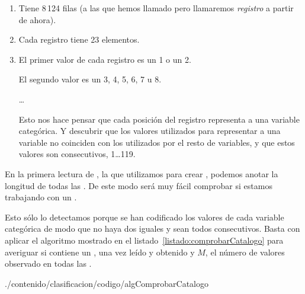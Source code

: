 \begin{enumerate}
	\item Tiene 8\,124 filas (a las que hemos llamado \transacciones pero llamaremos \emph{registro} a partir de ahora).
	\item Cada registro tiene 23 elementos.
   \item El primer valor de cada registro es un 1 o un 2.
         
         El segundo valor es un 3, 4, 5, 6, 7 u 8.
         
         \ldots
         
         Esto nos hace pensar que cada posición del registro representa a una variable categórica. Y descubrir que los valores utilizados para representar a una variable no coinciden con los utilizados por el resto de variables, y que estos valores son consecutivos, 1\ldots119.
\end{enumerate}

En la primera lectura de \D, la que utilizamos para crear \aprioriC[1], podemos anotar la longitud de todas las \transacciones. De este modo será muy fácil comprobar si estamos trabajando con un \catalogo.

Esto sólo lo detectamos porque se han codificado los valores de cada variable categórica de modo que no haya dos iguales y sean todos consecutivos. Basta con aplicar el algoritmo mostrado en el listado~\ref{listado:comprobarCatalogo} para averiguar si \D contiene un \catalogo, una vez leído y obtenido \aprioriC[1] y $M$, el número de valores observado en todas las \transacciones.


                 {./contenido/clasificacion/codigo/algComprobarCatalogo}



